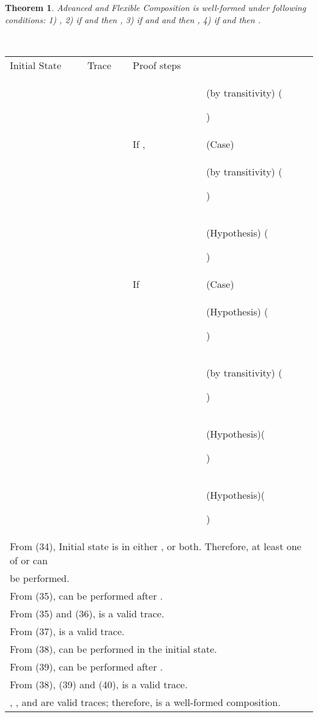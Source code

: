 \documentclass[12pt,journal,letterpaper,onecolumn]{IEEEtran}
\newcounter{myCounter}
\renewcommand{\themyCounter}{\arabic{myCounter}\addtocounter{myCounter}{1}}
\newtheorem{theorem}{Theorem}[section]
\begin{document}
\begin{theorem}
Advanced and Flexible Composition  is well-formed under following conditions: 1)
, 2) if  and  then
, 3) if  and  and  then , 4)
if  and  then  .
\label{theorem:advancedflexible} \end{theorem}
\\
\noindent
\begin{minipage}{6in} \begin{center}
\begin{tabular}{llp{6.3cm}p{3.8cm}}
Initial State & Trace &  Proof steps & \\
 & &    & (by transitivity) \hfill(\themyCounter)\\
 &  & If , & (Case)\\& &  & (by transitivity) \hfill(\themyCounter) \\
& &  & (Hypothesis) \hfill(\themyCounter) \\

&  & If  & (Case) \\ & &  & (Hypothesis) \hfill(\themyCounter)\\

&  &  & (by transitivity) \hfill(\themyCounter) \\
& &  & (Hypothesis)\hfill(\themyCounter)\\
& &  & (Hypothesis)\hfill(\themyCounter)\\
\multicolumn{4}{l}{From (34), Initial state  is in either ,  or both. Therefore, at least one of  or  can}\\
\multicolumn{4}{l}{be performed.}\\
\multicolumn{4}{l}{From (35),  can be performed after .}\\
\multicolumn{4}{l}{From (35) and (36),  is a valid trace.}\\
\multicolumn{4}{l}{From (37),  is a valid trace.}\\
\multicolumn{4}{l}{From (38),  can be performed in the initial state.}\\
\multicolumn{4}{l}{From (39),  can be performed after .}\\
\multicolumn{4}{l}{From (38), (39) and (40),  is a valid trace.}\\
\multicolumn{4}{l}{, , and  are valid traces;
therefore,  is a well-formed
composition.}\hfill
\end{tabular}
\end{center}
\end{minipage}\\
\end{document}
